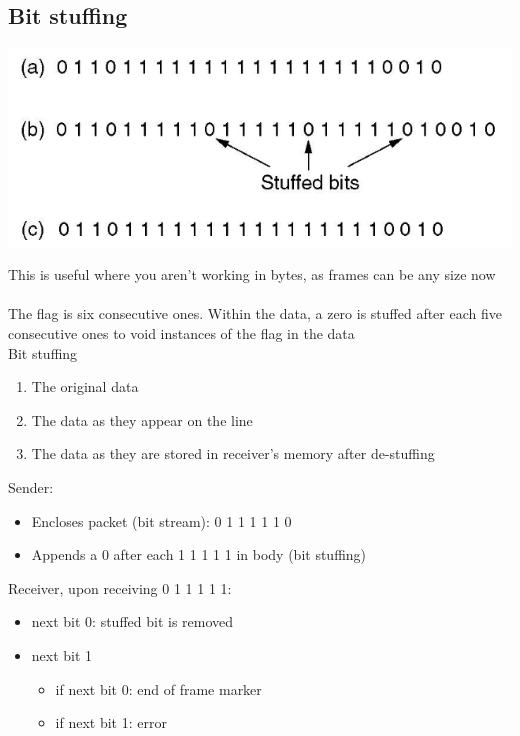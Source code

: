 \documentclass{article}[18pt]
\begin{document}
\subsection{Bit stuffing}
\begin{center}
	\includegraphics[scale=0.7]{"bit stuffing"}
\end{center}
This is useful where you aren't working in bytes, as frames can be any size now\\
\\
The flag is six consecutive ones. Within the data, a zero is stuffed after each five consecutive ones to void instances of the flag in the data\\
Bit stuffing
\begin{enumerate}[label=(\alph*)]
	\item The original data
	\item The data as they appear on the line
	\item The data as they are stored in receiver's memory after de-stuffing
\end{enumerate}
Sender:
\begin{itemize}
	\item Encloses packet (bit stream): 0 1 1 1 1 1 0
	\item Appends a 0 after each 1 1 1 1 1 in body (bit stuffing)
\end{itemize}
Receiver, upon receiving 0 1 1 1 1 1:
\begin{itemize}
	\item next bit 0: stuffed bit is removed
	\item next bit 1
	\begin{itemize}
		\item if next bit 0: end of frame marker
		\item if next bit 1: error
	\end{itemize}
\end{itemize}
\end{document}
